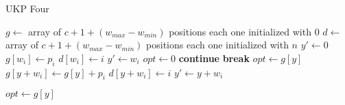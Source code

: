\documentclass[12pt]{article}
\begin{document}
\begin{algorithm}
\caption{UKP Four}\label{alg:ukp4}
\begin{algorithmic}[1]
  \State \(g \gets\) array of \(c + 1 + (w_{max} - w_{min})\) positions each one initialized with \(0\)\label{ukp4:create_g}
  \State \(d \gets\) array of \(c + 1 + (w_{max} - w_{min})\) positions each one initialized with \(n\)\label{ukp4:create_d}
  \State \(y' \gets 0\)
  \State %
  \label{ukp4:begin_trivial_bounds}
      \State \(g[w_i] \gets p_i\)
      \State \(d[w_i] \gets i\)
      	\State \underline{\(y' \gets w_i\)}
      \EndIf
    \EndIf
  \EndFor\label{ukp4:end_trivial_bounds}
  \State %
  \State \(opt \gets 0\)
  \label{ukp4:main_ext_loop_begin}
    \label{ukp4:if_no_greater_than_opt}
    	\State \textbf{continue}
    \EndIf
    \label{ukp4:if_greater_than_yprime}
    	\State \textbf{break}
    \EndIf
    \State %
    \State \(opt \gets g[y]\)
    \State %
    \label{ukp4:main_inner_loop_begin}
      \label{ukp4:if_better_solution_begin}
        \State \(g[y + w_i] \gets g[y] + p_i\)
        \State \(d[y + w_i] \gets i\)
	  \State \underline{\(y' \gets y + w_i\)}
        \EndIf
      \EndIf\label{ukp4:if_better_solution_end}
    \EndFor\label{ukp4:main_inner_loop_end}
  \EndFor\label{ukp4:main_ext_loop_end}
  \State %
  \label{ukp4:check_yprime}
  	
  \Else
    \label{ukp4:get_opt_loop_begin}
      \label{ukp4:opt_loop_if}
        \State \(opt \gets g[y]\)
      \EndIf
    \EndFor\label{ukp4:get_opt_loop_end}
  \EndIf
\EndProcedure
\end{algorithmic}
\end{algorithm}



\end{document}
